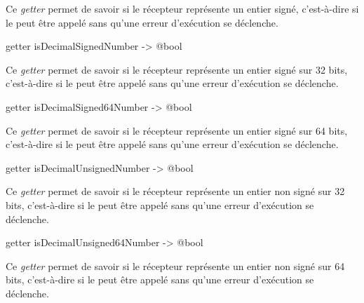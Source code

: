 Ce \emph{getter} permet de savoir si le récepteur représente un entier signé, c'est-à-dire si le  peut être appelé sans qu'une erreur d'exécution se déclenche.







\begin{galgasbox}
getter isDecimalSignedNumber -> @bool
\end{galgasbox}

Ce \emph{getter} permet de savoir si le récepteur représente un entier signé sur 32 bits, c'est-à-dire si le  peut être appelé sans qu'une erreur d'exécution se déclenche.







\begin{galgasbox}
getter isDecimalSigned64Number -> @bool
\end{galgasbox}

Ce \emph{getter} permet de savoir si le récepteur représente un entier signé sur 64 bits, c'est-à-dire si le  peut être appelé sans qu'une erreur d'exécution se déclenche.







\begin{galgasbox}
getter isDecimalUnsignedNumber -> @bool
\end{galgasbox}

Ce \emph{getter} permet de savoir si le récepteur représente un entier non signé sur 32 bits, c'est-à-dire si le  peut être appelé sans qu'une erreur d'exécution se déclenche.







\begin{galgasbox}
getter isDecimalUnsigned64Number -> @bool
\end{galgasbox}

Ce \emph{getter} permet de savoir si le récepteur représente un entier non signé sur 64 bits, c'est-à-dire si le  peut être appelé sans qu'une erreur d'exécution se déclenche.






